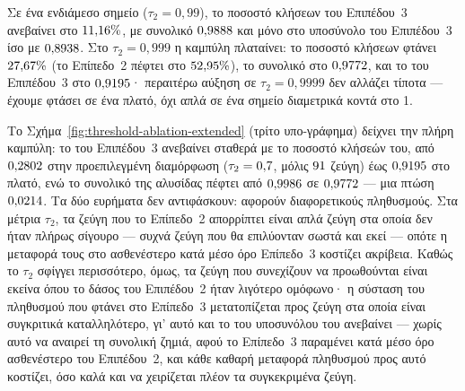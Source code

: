 Σε ένα ενδιάμεσο σημείο ($\tau_2 = 0{,}99$), το ποσοστό κλήσεων του Επιπέδου~3 ανεβαίνει
στο $11{,}16\%$, με συνολικό  $0{,}9888{}$
και  μόνο στο υποσύνολο του Επιπέδου~3 ίσο με
$0{,}8938{}$.
Στο $\tau_2 = 0{,}999$ η καμπύλη πλαταίνει: το
ποσοστό κλήσεων φτάνει $27{,}67\%$ (το Επίπεδο~2 πέφτει στο
$52{,}95\%$), το συνολικό  στο $0{,}9772{}$,
και το  του Επιπέδου~3 στο $0{,}9195{}$· περαιτέρω
αύξηση σε $\tau_2 = 0{,}9999$ δεν αλλάζει τίποτα --- έχουμε φτάσει σε ένα πλατό, όχι απλά
σε ένα σημείο διαμετρικά κοντά στο 1.

Το Σχήμα~\ref{fig:threshold-ablation-extended} (τρίτο υπο-γράφημα) δείχνει την πλήρη
καμπύλη: το  του Επιπέδου~3 ανεβαίνει σταθερά με το ποσοστό κλήσεών του, από
$0{,}2802{}$ στην προεπιλεγμένη διαμόρφωση ($\tau_2 = 0{,}7$, μόλις
$91{}$ ζεύγη) έως $0{,}9195{}$ στο πλατό, ενώ το
συνολικό  της αλυσίδας πέφτει από $0{,}9986{}$ σε
$0{,}9772{}$ --- μια πτώση $0{,}0214{}$.
Τα δύο ευρήματα δεν
αντιφάσκουν: αφορούν διαφορετικούς πληθυσμούς.
Στα μέτρια $\tau_2$, τα ζεύγη που το
Επίπεδο~2 απορρίπτει είναι απλά ζεύγη στα οποία δεν ήταν πλήρως σίγουρο --- συχνά
ζεύγη που θα επιλύονταν σωστά και εκεί --- οπότε η μεταφορά τους στο ασθενέστερο κατά
μέσο όρο Επίπεδο~3 κοστίζει ακρίβεια.
Καθώς το $\tau_2$ σφίγγει περισσότερο, όμως, τα
ζεύγη που συνεχίζουν να προωθούνται είναι εκείνα όπου το δάσος του Επιπέδου~2 ήταν
λιγότερο ομόφωνο· η σύσταση του πληθυσμού που φτάνει στο Επίπεδο~3 μετατοπίζεται προς
ζεύγη στα οποία είναι συγκριτικά καταλληλότερο, γι' αυτό και το  του
υποσυνόλου του ανεβαίνει --- χωρίς αυτό να αναιρεί τη συνολική ζημιά, αφού το Επίπεδο~3
παραμένει κατά μέσο όρο ασθενέστερο του Επιπέδου~2, και κάθε καθαρή μεταφορά πληθυσμού
προς αυτό κοστίζει, όσο καλά και να χειρίζεται πλέον τα συγκεκριμένα ζεύγη.

